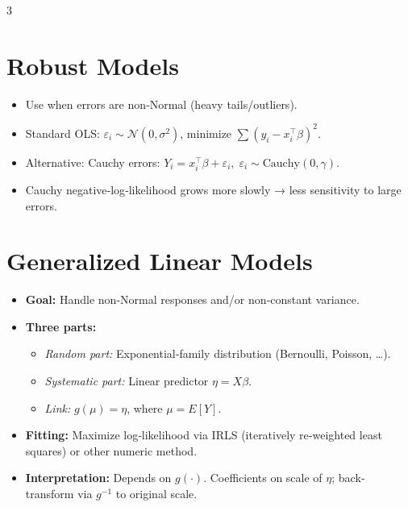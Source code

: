 \documentclass[10pt,landscape]{article}
\begin{document}
\begin{multicols}{3}
\section{Robust Models}
\begin{itemize}
  \item Use when errors are non‐Normal (heavy tails/outliers).
  \item Standard OLS: $\varepsilon_i\sim\mathcal{N}(0,\sigma^2)$, minimize $\sum(y_i - x_i^\top\beta)^2$.
  \item Alternative: Cauchy errors: $Y_i = x_i^\top\beta + \varepsilon_i,\;\varepsilon_i\sim\text{Cauchy}(0,\gamma)$.
  \item Cauchy negative‐log‐likelihood grows more slowly → less sensitivity to large errors.
\end{itemize}

\section{Generalized Linear Models}
\begin{itemize}
  \item \textbf{Goal:} Handle non‐Normal responses and/or non‐constant variance.
  \item \textbf{Three parts:}
    \begin{itemize}
      \item \emph{Random part:} Exponential‐family distribution (Bernoulli, Poisson, …).
      \item \emph{Systematic part:} Linear predictor $\eta = X\beta$.
      \item \emph{Link:} $g(\mu)=\eta$, where $\mu=E[Y]$.
    \end{itemize}
  \item \textbf{Fitting:} Maximize log‐likelihood via IRLS (iteratively re‐weighted least squares) or other numeric method.
  \item \textbf{Interpretation:} Depends on $g(\cdot)$. Coefficients on scale of $\eta$; back‐transform via $g^{-1}$ to original scale.
\end{itemize}


\end{multicols}
\end{document}

